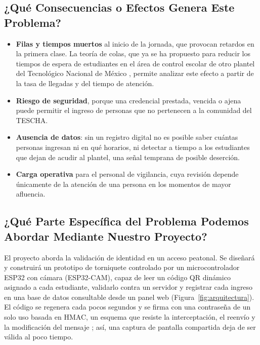 \documentclass[stu,11pt,floatsintext,biblatex]{apa7}
\begin{document}
\subsection{¿Qué Consecuencias o Efectos Genera Este Problema?}
\begin{itemize}
  \item \textbf{Filas y tiempos muertos} al inicio de la jornada, que
  provocan retardos en la primera clase. La teoría de colas, que ya se ha
  propuesto para reducir los tiempos de espera de estudiantes en el área de
  control escolar de otro plantel del Tecnológico Nacional de México
  \parencite{talavera2025espera}, permite analizar este efecto a partir de la
  tasa de llegadas y del tiempo de atención.
  \item \textbf{Riesgo de seguridad}, porque una credencial prestada, vencida
  o ajena puede permitir el ingreso de personas que no pertenecen a la
  comunidad del TESCHA.
  \item \textbf{Ausencia de datos}: sin un registro digital no es posible
  saber cuántas personas ingresan ni en qué horarios, ni detectar a tiempo a
  los estudiantes que dejan de acudir al plantel, una señal temprana de
  posible deserción.
  \item \textbf{Carga operativa} para el personal de vigilancia, cuya
  revisión depende únicamente de la atención de una persona en los momentos
  de mayor afluencia.
\end{itemize}

\subsection{¿Qué Parte Específica del Problema Podemos Abordar Mediante Nuestro Proyecto?}
El proyecto aborda la validación de identidad en un acceso peatonal. Se
diseñará y construirá un prototipo de torniquete controlado por un
microcontrolador ESP32 con cámara (ESP32-CAM), capaz de leer un código QR
dinámico asignado a cada estudiante, validarlo contra un servidor y registrar
cada ingreso en una base de datos consultable desde un panel web
(Figura~\ref{fig:arquitectura}). El código se regenera cada pocos segundos y
se firma con una contraseña de un solo uso basada en HMAC, un esquema que
resiste la interceptación, el reenvío y la modificación del mensaje
\parencite{subpratatsavee2015hmac}; así, una captura de pantalla compartida
deja de ser válida al poco tiempo.
\end{document}
